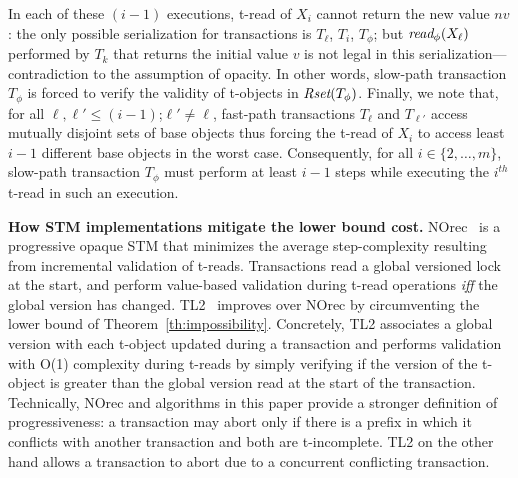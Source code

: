 \begin{proofsketch}
In each of these $(i-1)$ executions, t-read of $X_i$ cannot return the new value $nv$:
the only possible serialization for transactions is $T_{\ell}$, $T_i$, $T_{\phi}$; but $\textit{read}_{\phi}(X_{\ell})$
performed by $T_k$ that returns the initial value $v$ is not legal in this serialization---contradiction to the assumption of opacity.
In other words, slow-path transaction $T_{\phi}$ is forced to verify the validity of t-objects in $\textit{Rset}(T_{\phi})$.
Finally, we note that, for all $\ell, \ell' \leq (i-1)$;$\ell' \neq \ell$, 
fast-path transactions $T_{\ell}$ and $T_{\ell'}$ access mutually disjoint sets of base objects thus forcing the t-read of $X_i$ to access least $i-1$ different base objects
in the worst case.
Consequently, for all $i \in \{2,\ldots, m\}$, slow-path transaction $T_{\phi}$ must perform at least $i-1$ steps 
while executing the $i^{th}$ t-read in such an execution.
\end{proofsketch}
%
%
\vspace{1mm}\noindent\textbf{How STM implementations mitigate the lower bound cost.}
NOrec~\cite{norec} is a progressive opaque STM that minimizes the average step-complexity resulting from incremental 
validation of t-reads. Transactions read a global versioned lock at the start, and perform value-based validation
during t-read operations \emph{iff} the global version has changed.
TL2~\cite{DSS06} improves over NOrec by circumventing the lower bound
of Theorem~\ref{th:impossibility}. Concretely, TL2 associates a global version with each t-object updated during
a transaction and performs validation with O(1) complexity during t-reads by simply verifying if the version
of the t-object is greater than the global version read at the start of the transaction. Technically,
NOrec and algorithms in this paper provide a stronger definition of progressiveness: a transaction may abort
only if there is a prefix in which it conflicts with another transaction and both are t-incomplete. TL2 on the other hand allows
a transaction to abort due to a concurrent conflicting transaction.

